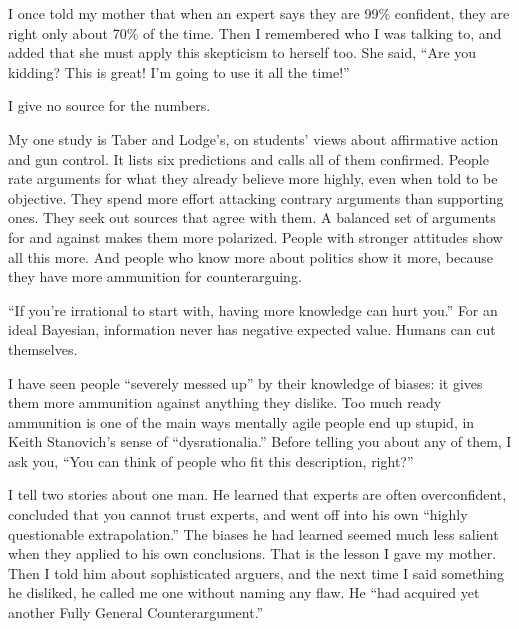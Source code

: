 
I once told my mother that when an expert says they are 99\% confident, they are right only about 70\% of the time. Then I remembered who I was talking to, and added that she must apply this skepticism to herself too. She said, ``Are you kidding? This is great! I'm going to use it all the time!''

I give no source for the numbers. 

My one study is Taber and Lodge's, on students' views about affirmative action and gun control. It lists six predictions and calls all of them confirmed. People rate arguments for what they already believe more highly, even when told to be objective. They spend more effort attacking contrary arguments than supporting ones. They seek out sources that agree with them. A balanced set of arguments for and against makes them more polarized. People with stronger attitudes show all this more. And people who know more about politics show it more, because they have more ammunition for counterarguing. 

``If you're irrational to start with, having more knowledge can hurt you.'' For an ideal Bayesian, information never has negative expected value. Humans can cut themselves.

I have seen people ``severely messed up'' by their knowledge of biases: it gives them more ammunition against anything they dislike. Too much ready ammunition is one of the main ways mentally agile people end up stupid, in Keith Stanovich's sense of ``dysrationalia.'' Before telling you about any of them, I ask you, ``You can think of people who fit this description, right?''

I tell two stories about one man. He learned that experts are often overconfident, concluded that you cannot trust experts, and went off into his own ``highly questionable extrapolation.'' The biases he had learned seemed much less salient when they applied to his own conclusions. That is the lesson I gave my mother. Then I told him about sophisticated arguers, and the next time I said something he disliked, he called me one without naming any flaw. He ``had acquired yet another Fully General Counterargument.''

